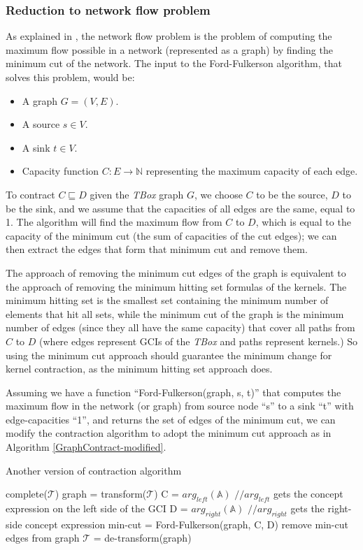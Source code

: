 \subsubsection{Reduction to network flow problem}
As explained in \cite{alg}, the network flow problem is the problem of computing the maximum flow possible in a network (represented as a graph) by finding the minimum cut of the network. The input to the Ford-Fulkerson algorithm, that solves this problem, would be:
\begin{itemize}
\item A graph $G = (V, E)$.
\item A source $s \in V$.
\item A sink $t \in V$.
\item Capacity function $C:E \rightarrow \mathbb{N}$ representing the maximum capacity of each edge.
\end{itemize}

To contract $C \sqsubseteq D$ given the \textit{TBox} graph $G$, we choose $C$ to be the source, $D$ to be the sink, and we assume that the capacities of all edges are the same, equal to 1. The algorithm will find the maximum flow from $C$ to $D$, which is equal to the capacity of the minimum cut (the sum of capacities of the cut edges); we can then extract the edges that form that minimum cut and remove them.

The approach of removing the minimum cut edges of the graph is equivalent to the approach of removing the minimum hitting set formulas of the kernels. The minimum hitting set is the smallest set containing the minimum number of elements that hit all sets, while the minimum cut of the graph is the minimum number of edges (since they all have the same capacity) that cover all paths from $C$ to $D$ (where edges represent GCIs of the \textit{TBox} and paths represent kernels.) So using the minimum cut approach should guarantee the minimum change for kernel contraction, as the minimum hitting set approach does.

Assuming we have a function ``Ford-Fulkerson(graph, s, t)'' that computes the maximum flow in the network (or graph) from source node ``s'' to a sink  ``t'' with edge-capacities ``1'', and returns the set of edges of the minimum cut, we can modify the contraction algorithm to adopt the minimum cut approach as in Algorithm \ref{GraphContract-modified}.

\begin{algorithm}
\caption{Another version of contraction algorithm}
\label{GraphContract-modified}
\begin{algorithmic}[1]
\State complete($ \mathcal{T} $)
\State graph = transform($ \mathcal{T} $)
\State C = $arg_{left}(\mathbb{A})$ $//arg_{left}$ gets the concept expression on the left side of the GCI
\State D = $arg_{right}(\mathbb{A})$ $//arg_{right}$ gets the right-side concept expression
\State min-cut = Ford-Fulkerson(graph, C, D)
\State remove min-cut edges from graph
\State $ \mathcal{T} $ = de-transform(graph)
\EndFunction
\end{algorithmic}
\end{algorithm}

